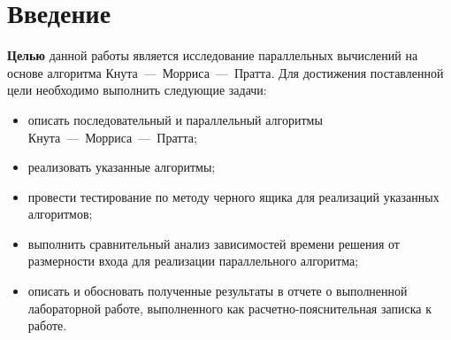 \chapter*{Введение}

\textbf{Целью} данной работы является исследование параллельных вычислений на основе алгоритма Кнута~---~Морриса~---~Пратта. Для достижения поставленной цели необходимо выполнить следующие задачи:
\begin{itemize}[label=---]
	\item описать последовательный и параллельный алгоритмы Кнута~---~Морриса~---~Пратта;
	\item реализовать указанные алгоритмы;
	\item провести тестирование по методу черного ящика для реализаций указанных алгоритмов;
	\item выполнить сравнительный анализ зависимостей времени решения от размерности входа для реализации параллельного алгоритма;	
	\item описать и обосновать полученные результаты в отчете о выполненной лабораторной работе, выполненного как расчетно-пояснительная записка к работе.
\end{itemize}
